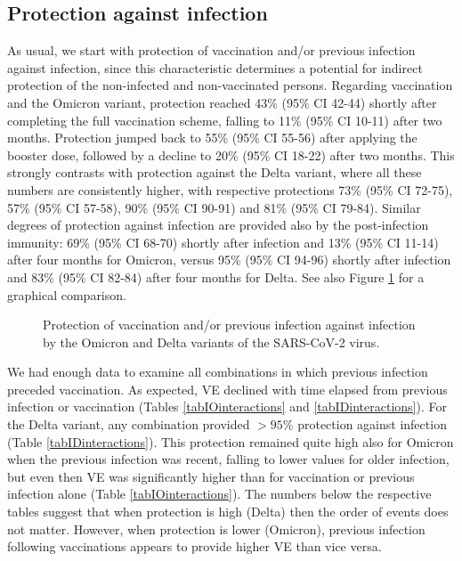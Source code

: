 \documentclass[preprint,12pt,authoryear]{elsarticle}
\begin{document}
\subsection*{Protection against infection}

As usual, we start with protection of vaccination and/or previous infection against infection, since this characteristic determines a potential for indirect protection of the non-infected and non-vaccinated persons. Regarding vaccination and the Omicron variant, protection reached 43\% (95\% CI 42-44) shortly after completing the full vaccination scheme, falling to 11\% (95\% CI 10-11) after two months. Protection jumped back to 55\% (95\% CI 55-56) after applying the booster dose, followed by a decline to 20\% (95\% CI 18-22) after two months. This strongly contrasts with protection against the Delta variant, where all these numbers are consistently higher, with respective protections 73\% (95\% CI 72-75), 57\% (95\% CI 57-58), 90\% (95\% CI 90-91) and 81\% (95\% CI 79-84). Similar degrees of protection against infection are provided also by the post-infection immunity: 69\% (95\% CI 68-70) shortly after infection and 13\% (95\% CI 11-14) after four months for Omicron, versus 95\% (95\% CI 94-96) shortly after infection and 83\% (95\% CI 82-84) after four months for Delta. See also Figure \ref{figIalone} for a graphical comparison.

\begin{figure}[h]
\centering
\caption{Protection of vaccination and/or previous infection against infection by the Omicron and Delta variants of the SARS-CoV-2 virus.}
\label{figIalone}
\end{figure}

We had enough data to examine all combinations in which previous infection preceded vaccination. As expected, VE declined with time elapsed from previous infection or vaccination (Tables \ref{tabIOinteractions} and \ref{tabIDinteractions}). For the Delta variant, any combination provided $>95\%$ protection against infection (Table \ref{tabIDinteractions}). This protection remained quite high also for Omicron when the previous infection was recent, falling to lower values for older infection, but even then VE was significantly higher than for vaccination or previous infection alone (Table \ref{tabIOinteractions}). The numbers below the respective tables suggest that when protection is high (Delta) then the order of events does not matter. However, when protection is lower (Omicron), previous infection following vaccinations appears to provide higher VE than vice versa. 
\end{document}
